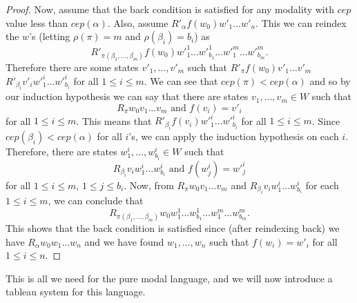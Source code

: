 \begin{proof}
    \par Now, assume that the back condition is satisfied for any modality with $cep$ value less than $cep(\alpha)$. Also, assume $R'_\alpha f(w_0)w'_1\ldots w'_n$. This we can reindex the $w$'s (letting $\rho(\pi) = m$ and $\rho(\beta_i) = b_i$) as $$R'_{\pi(\beta_1,\ldots,\beta_m)} f(w_0)w'^1_1\ldots w'^1_{b_1} \ldots w'^m_1\ldots w'^m_{b_m}.$$ 
    Therefore there are some states $v'_1,\ldots,v'_m$ such that $R'_\pi f(w_0)v'_1\ldots v'_m$  $R'_{\beta_i} v'_iw'^i_1\ldots w'^i_{b_i}$ for all $1\leq i\leq m$. We can see that $cep(\pi)<cep(\alpha)$ and so by our induction hypothesis we can say that there are states $v_1,\ldots,v_m\in W$ such that $$R_\pi w_0v_1\ldots v_m \text{ and } f(v_i) = v'_i$$ for all $1\leq i\leq m$. This means that $R'_{\beta_i} f(v_i)w'^i_1\ldots w'^i_{b_i}$ for all $1\leq i\leq m$. Since $cep(\beta_i)<cep(\alpha)$ for all $i$'s, we can apply the induction hypothesis on each $i$. Therefore, there are states $w^i_1,\ldots, w^i_{b_i}\in W$ such that $$R_{\beta_i} v_iw^i_1\ldots w^i_{b_i} \text{ and } f(w^i_j) = w'^i_j$$ for all $1\leq i\leq m$, $1\leq j\leq b_i$. Now, from $R_\pi w_0v_1\ldots v_m$ and $R_{\beta_i} v_iw^i_1\ldots w^i_{b_i}$ for each $1\leq i\leq m$, we can conclude that $$R_{\pi(\beta_1,\ldots,\beta_m)} w_0w^1_1\ldots w^1_{b_1} \ldots w^m_1\ldots w^m_{b_m}.$$ This shows that the back condition is satisfied since (after reindexing back) we have $R_\alpha w_0w_1\ldots w_n$ and we have found $w_1,\ldots,w_n$ such that $f(w_i) = w'_i$ for all $1\leq i\leq n$.
\end{proof}


\par This is all we need for the pure modal language, and we will now introduce a tableau system for this language.
